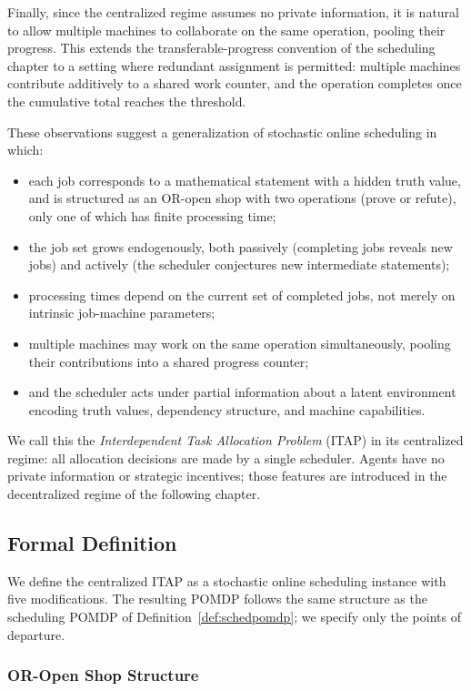 Finally, since the centralized regime assumes no private information, it is natural
to allow multiple machines to collaborate on the same operation, pooling their
progress. This extends the transferable-progress convention of the scheduling chapter
to a setting where redundant assignment is permitted: multiple machines contribute
additively to a shared work counter, and the operation completes once the cumulative
total reaches the threshold.


These observations suggest a generalization of stochastic online scheduling in which:
\begin{itemize}
    \item each job corresponds to a mathematical statement with a hidden truth value,
    and is structured as an OR-open shop with two operations (prove or refute), only
    one of which has finite processing time;
    \item the job set grows endogenously, both passively (completing jobs reveals new
    jobs) and actively (the scheduler conjectures new intermediate statements);
    \item processing times depend on the current set of completed jobs, not merely on
    intrinsic job-machine parameters;
    \item multiple machines may work on the same operation simultaneously, pooling
    their contributions into a shared progress counter;
    \item and the scheduler acts under partial information about a latent environment
    encoding truth values, dependency structure, and machine capabilities.
\end{itemize}

We call this the \emph{Interdependent Task Allocation Problem} (ITAP) in its
centralized regime: all allocation decisions are made by a single scheduler. Agents
have no private information or strategic incentives; those features are introduced in
the decentralized regime of the following chapter.


\subsection{Formal Definition}

We define the centralized ITAP as a stochastic online scheduling instance with five modifications. The resulting POMDP follows the
same structure as the scheduling POMDP of Definition~\ref{def:schedpomdp}; we specify
only the points of departure.

\subsubsection{OR-Open Shop Structure}


